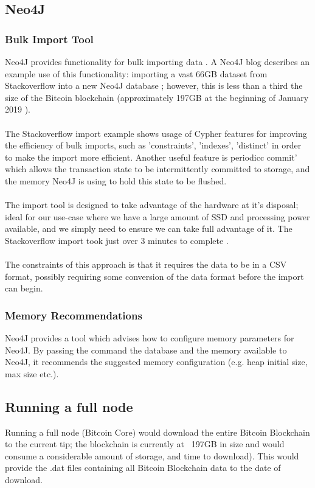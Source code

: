 \subsection{Neo4J}

\subsubsection{Bulk Import Tool}
Neo4J provides functionality for bulk importing data \cite{RefWorks:doc:5c6ab610e4b02c4a19ae3ed1}. A Neo4J blog describes an example use of this functionality: importing a  vast 66GB dataset from Stackoverflow into a new Neo4J database \cite{RefWorks:doc:5c6ab2bae4b08c9b85da964f}; however, this is less than a third the size of the Bitcoin blockchain (approximately 197GB at the beginning of January 2019 \cite{RefWorks:doc:5c6ab1a3e4b05e3aaec0ffc8}).
\\\\ 
The Stackoverflow import example shows usage of Cypher features for improving the efficiency of bulk imports, such as 'constraints', 'indexes', 'distinct'  in order to make the import more efficient. Another useful feature is periodicc commit' which allows the transaction state to be intermittently committed to storage, and the memory Neo4J is using to hold this state to be flushed. 
\\\\
The import tool is designed to take advantage of the hardware at it's disposal; ideal for our use-case where we have a large amount of SSD and processing power available, and we simply need to ensure we can take full advantage of it. The Stackoverflow import took just over 3 minutes to complete \cite{RefWorks:doc:5c6ab2bae4b08c9b85da964f}. 
\\\\
The constraints of this approach is that it requires the data to be in a CSV format, possibly requiring some conversion of the data format before the import can begin. 

\subsubsection{Memory Recommendations}
Neo4J provides a tool which advises how to configure memory parameters for Neo4J. By passing the command the database and the memory available to Neo4J, it recommends the suggested memory configuration (e.g. heap initial size, max size etc.). 

\subsection{Running a full node}
Running a full node (Bitcoin Core) would download the entire Bitcoin Blockchain to the current tip; the blockchain is currently at ~197GB\cite{RefWorks:doc:5c6ab1a3e4b05e3aaec0ffc8} in size and would consume a considerable amount of storage, and time to download). This would provide the .dat files containing all Bitcoin Blockchain data to the date of download. 



